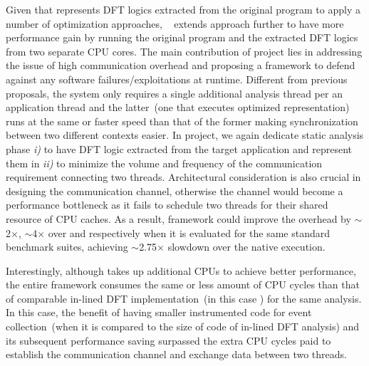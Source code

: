 \documentclass[letterpaper, 10pt]{article}
\begin{document}
\begin{small}
%
Given that \TFA represents DFT logics extracted from the original program to
apply a number of optimization approaches, \SR~\cite{sreplica:2013ccs} extends
\TFA approach further to have more performance gain by running the original
program and the extracted DFT logics from two separate CPU cores.
%
%
The main contribution of \SR project lies in addressing the issue of high
communication overhead and proposing a framework  to defend against any
software failures/exploitations at runtime. Different from previous proposals,
the system only requires a single additional analysis thread per an application
thread and the latter~(one that executes optimized \TFA representation) runs at
the same or faster speed than that of the former making synchronization between
two different contexts easier.
%
In \SR project, we again dedicate static analysis phase {\it i)} to have DFT
logic extracted from the target application and represent them in \TFA
\xspace{\it ii)} to minimize the volume and frequency of the communication
requirement connecting two threads.
%
Architectural consideration is also crucial in designing the communication
channel, otherwise the channel would become a performance bottleneck as it
fails to schedule two threads for their shared resource of CPU caches.
%
As a result, \SR framework could improve the overhead by $\sim$2$\times$,
$\sim$4$\times$ over \TFA and \libdft respectively when it is evaluated for the
same standard benchmark suites, achieving $\sim$2.75$\times$ slowdown over the
native execution.

Interestingly, although \SR takes up additional CPUs to achieve better
performance, the entire framework consumes the same or less amount of CPU
cycles than that of comparable in-lined DFT implementation~(in this case \TFA)
for the same analysis.
%
In this case, the benefit of having smaller instrumented code for event
collection~(when it is compared to the size of code of in-lined DFT analysis)
and its subsequent performance saving surpassed the extra CPU cycles paid to
establish the communication channel and exchange data between two threads.


\end{small}
\end{document}
